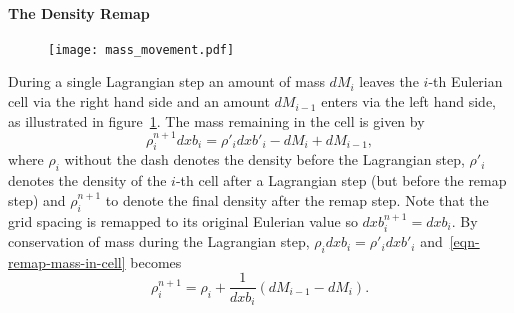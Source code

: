 \paragraph{The Density Remap}

\begin{figure}[t]
  \centering
  \texttt{[image: mass\_movement.pdf]}
  \label{fig:mass_movement}
\end{figure}

During a single Lagrangian step an amount of mass $dM_i$ leaves the $i$-th Eulerian cell via the right hand side and an amount $dM_{i-1}$ enters via the left hand side, as illustrated in figure~\ref{fig:mass_movement}. The mass remaining in the cell is given by
\begin{equation}
  \rho^{n+1}_i dxb_i = \rho'_i dxb'_i - dM_i + dM_{i-1},
  \label{eqn-remap-mass-in-cell}
\end{equation}
where $\rho_i$ without the dash denotes the density before the Lagrangian step, $\rho'_i$ denotes the density of the $i$-th cell after a Lagrangian step (but before the remap step) and $\rho_i^{n+1}$ to denote the final density after the remap step. Note that the grid spacing is remapped to its original Eulerian value so $dxb^{n+1}_i = dxb_i$. By conservation of mass during the Lagrangian step, $\rho_i dxb_i = \rho'_i dxb'_i$ and~\eqref{eqn-remap-mass-in-cell} becomes
\begin{equation}
  \rho^{n+1}_i = \rho_i + \frac{1}{dxb_i} (dM_{i-1} - dM_i).
  \label{eqn-remap-density}
\end{equation}

